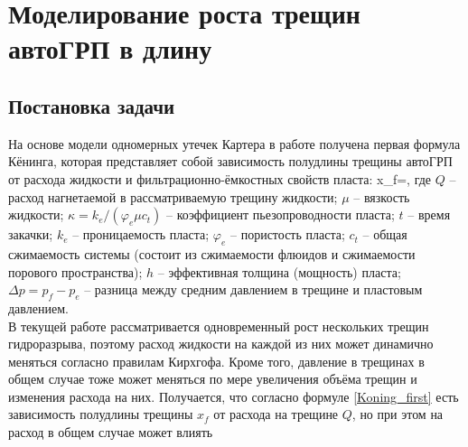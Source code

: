 \chapter{Моделирование роста трещин автоГРП в длину} \label{ch3}

\section{Постановка задачи}
\vspace*{-5mm}

На основе модели одномерных утечек Картера \cite{karter} в работе \cite{koning} получена первая формула Кёнинга, которая представляет собой зависимость полудлины трещины автоГРП от расхода жидкости и фильтрационно-ёмкостных свойств пласта:
\beq\label{Koning_first}
x_{\!f}=,
\eeq
где $Q$ -- расход нагнетаемой в рассматриваемую трещину жидкости;
$\mu$ -- вязкость жидкости;
$\kappa=k_e/(\varphi_e\mu c_t)$ -- коэффициент пьезопроводности пласта;
$t$ -- время закачки;
$k_e$ -- проницаемость пласта;
$\varphi_e$ -- пористость пласта;
$c_t$ -- общая сжимаемость системы (состоит из сжимаемости флюидов и сжимаемости порового пространства);
$h$ -- эффективная толщина (мощность) пласта;
$\Delta p=p_{\!f}-p_e$ -- разница между средним давлением в трещине и пластовым давлением.\\

В текущей работе рассматривается одновременный рост нескольких трещин гидроразрыва, поэтому расход жидкости на каждой из них может динамично меняться согласно правилам Кирхгофа.
Кроме того, давление в трещинах в общем случае тоже может меняться по мере увеличения объёма трещин и изменения расхода на них.
Получается, что согласно формуле \eqref{Koning_first} есть зависимость полудлины трещины $x_f$ от расхода на трещине $Q$, но при этом на расход в общем случае может влиять 

